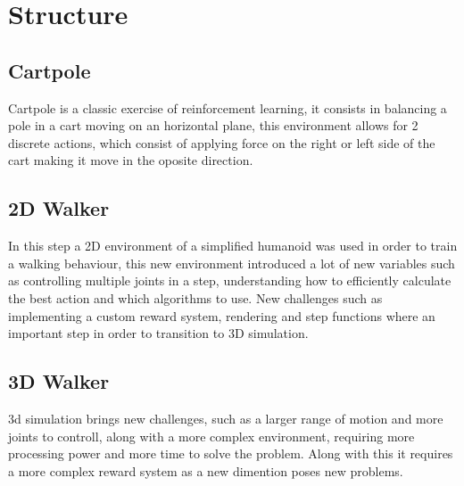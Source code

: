 \section{Structure}

\subsection{Cartpole}
Cartpole is a classic exercise of reinforcement learning, it consists in balancing a pole in a cart moving on an horizontal plane, 
this environment allows for 2 discrete actions, 
which consist of applying force on the right or left side of the cart making it move in the oposite direction. 

\subsection{2D Walker}
In this step a 2D environment of a simplified humanoid was used in order to train a walking behaviour,
this new environment introduced a lot of new variables such as controlling multiple joints in a step, %
understanding how to efficiently calculate the best action and which algorithms to use. 
New challenges such as implementing a custom reward system, rendering and step functions where an important step in order to transition to 3D simulation.

\subsection{3D Walker}
3d simulation brings new challenges, such as a larger range of motion and more joints to controll, along with a more complex environment, requiring more processing power and more time to solve the problem. 
Along with this it requires a more complex reward system as a new dimention poses new problems.




